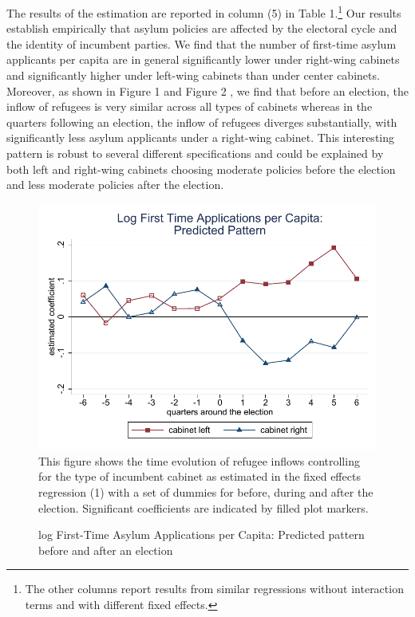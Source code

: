 \documentclass[a4paper,12pt]{article}
\begin{document}
The results of the estimation are reported in column (5) in Table 1.\footnote{The other columns report results from similar regressions without interaction terms and with different fixed effects. } Our results establish empirically that asylum policies are affected by the electoral cycle and the identity of incumbent parties. We find that the number of first-time asylum applicants per capita are in general significantly lower under right-wing cabinets and significantly higher under left-wing cabinets than under center cabinets. Moreover, as shown in Figure 1 and Figure 2 , we find that before an election, the inflow of refugees is very similar across all types of cabinets whereas in the quarters following an election, the inflow of refugees diverges substantially, with significantly less asylum applicants under a right-wing cabinet. This interesting pattern is robust to several different specifications and could be explained by both left and right-wing cabinets choosing moderate policies before the election and less moderate policies after the election. 
\begin{figure}
	\centering
    	\caption{log First-Time Asylum Applications per Capita: Predicted pattern before and after an election}
	\includegraphics[width=1\textwidth]{app_Graph2.pdf}
    {\footnotesize This figure shows the time evolution of refugee inflows controlling for the type of incumbent cabinet as estimated in the fixed effects regression (1) with a set of dummies for before, during and after the election. Significant coefficients are indicated by filled plot markers. }
	\label{Figure1}
\end{figure}
\end{document}
